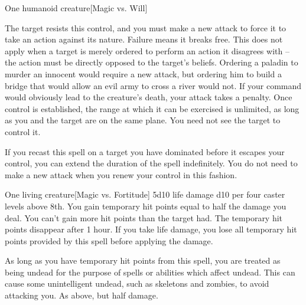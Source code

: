 \begin{spelleffects}
\begin{spelltarget}{One humanoid creature}[Magic vs. Will]
        \par The target resists this control, and you must make a new attack to force it to take an action against its nature. Failure means it breaks free. This does not apply when a target is merely ordered to perform an action it disagrees with -- the action must be directly opposed to the target's beliefs. Ordering a paladin to murder an innocent would require a new attack, but ordering him to build a bridge that would allow an evil army to cross a river would not. If your command would obviously lead to the creature's death, your attack takes a  penalty. Once control is established, the range at which it can be exercised is unlimited, as long as you and the target are on the same plane. You need not see the target to control it.
        \par If you recast this spell on a target you have dominated before it escapes your control, you can extend the duration of the spell indefinitely. You do not need to make a new attack when you renew your control in this fashion.
    \end{spelltarget}
\end{spelleffects}

\begin{spellheader}
    \spellrng{\rngclose}
    \spelldur{\durlong}
\end{spellheader}
\begin{spelleffects}
    \begin{spelltarget}{One living creature}[Magic vs. Fortitude]
        \spellsuccess 5d10 life damage \add d10 per four caster levels above 8th. You gain temporary hit points equal to half the damage you deal. You can't gain more hit points than the target had. The temporary hit points disappear after 1 hour. If you take life damage, you lose all temporary hit points provided by this spell before applying the damage.

        As long as you have temporary hit points from this spell, you are treated as being undead for the purpose of spells or abilities which affect undead. This can cause some unintelligent undead, such as skeletons and zombies, to avoid attacking you.
        \spellfailure As above, but half damage.
    \end{spelltarget}
\end{spelleffects}

\begin{comment}
\subsubsection{E}
\end{comment}

